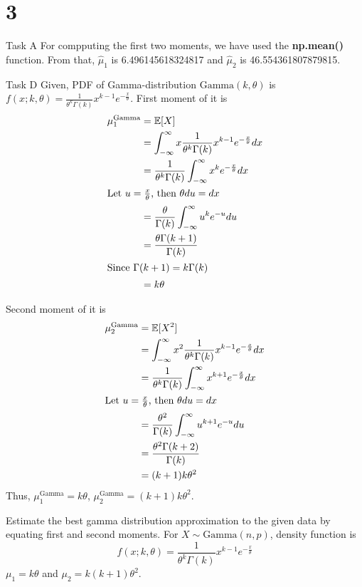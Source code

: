 \chapter{3}


\begin{task}{Task A}
	For compputing the first two moments, we have used the
	\textbf{np.mean()} function. From that, $\hat{\mu}_{1}$ is
	6.496145618324817
	and  $\hat{\mu}_{2}$ is 46.554361807879815.
\end{task}

\begin{task}{Task D}
	Given, PDF of Gamma-distribution $\text{Gamma}(k, \theta)$ is
	$f(x;k,\theta) =
		\frac{1}{\theta^k\Gamma(k)}x^{k-1}e^{-\frac{x}{\theta}}$. First moment
	of it is
	\begin{align}
		\mu_1^\text{Gamma} & = \mathbb{E}[X]                               \\
		                   & = \int_{-\infty}^\infty
		x\frac{1}{\theta^k\Gamma(k)}x^{k-1}e^{-\frac{x}{\theta}}dx
		\\
		                   & =
		\frac{1}{\theta^k\Gamma(k)}\int_{-\infty}^\infty
		x^ke^{-\frac{x}{\theta}}dx                                 \\
		\intertext{Let $u = \frac{x}{\theta}$, then $\theta du = dx$}
		                   & =
		\frac{\theta}{\Gamma(k)}\int_{-\infty}^\infty
		u^k e^{-u} du                                              \\
		                   & = \frac{\theta\Gamma(k+1)}{\Gamma(k)}
		\\
		\intertext{Since $\Gamma(k+1)=k\Gamma(k)$}
		                   & = k\theta
	\end{align}

	Second moment of it is
	\begin{align}
		\mu_2^\text{Gamma} & = \mathbb{E}[X^2]                               \\
		                   & = \int_{-\infty}^\infty
		x^2\frac{1}{\theta^k\Gamma(k)}x^{k-1}e^{-\frac{x}{\theta}}dx
		\\
		                   & =
		\frac{1}{\theta^k\Gamma(k)}\int_{-\infty}^\infty
		x^{k+1}e^{-\frac{x}{\theta}}dx                               \\
		\intertext{Let $u = \frac{x}{\theta}$, then $\theta du = dx$}
		                   & =
		\frac{\theta^2}{\Gamma(k)}\int_{-\infty}^\infty
		u^{k+1}e^{-u} du                                             \\
		                   & = \frac{\theta^2\Gamma(k+2)}{\Gamma(k)}
		\\
		                   & = (k+1)k\theta^2
	\end{align}
	Thus, $\mu_1^\text{Gamma} = k\theta$, $\mu_2^\text{Gamma} = (k+1)k\theta^2$.

	Estimate the best gamma distribution approximation to the given data by
	equating first and second moments. For $X\sim\text{Gamma}(n,p)$,
	density function is
	\begin{equation}
		f(x; k, \theta) = \frac{1}{\theta^k\Gamma(k)} x^{k-1} e^{-\frac{x}{\theta}}
	\end{equation}
	$\mu_1 = k\theta$ and $\mu_2 = k(k+1)\theta^2$.
\end{task}

